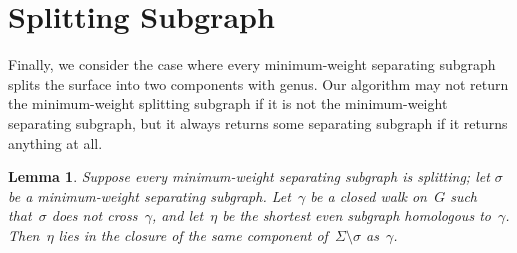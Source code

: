 \documentclass[twoside,leqno,twocolumn]{article}
\newtheorem{lemma}[theorem]{Lemma}
\begin{document}
\section{Splitting Subgraph}

\label{S:splitting}
Finally, we consider the case where every minimum-weight separating subgraph splits the surface into two components with genus.  Our algorithm may not return the minimum-weight splitting subgraph if it is not the minimum-weight separating subgraph, but it always returns some separating subgraph if it returns anything at all.

\begin{lemma}
  \label{L:split-nocross}
  Suppose every minimum-weight separating subgraph is splitting;
  let $\sigma$ be a minimum-weight separating subgraph.
  Let~$\gamma$ be a closed walk on~$G$ such that~$\sigma$
  does not cross~$\gamma$, and let~$\eta$ be the
  shortest even subgraph homologous to~$\gamma$.
  Then~$\eta$ lies in the closure of the same component
  of~$\Sigma \setminus \sigma$ as~$\gamma$.
\end{lemma}
\end{document}
